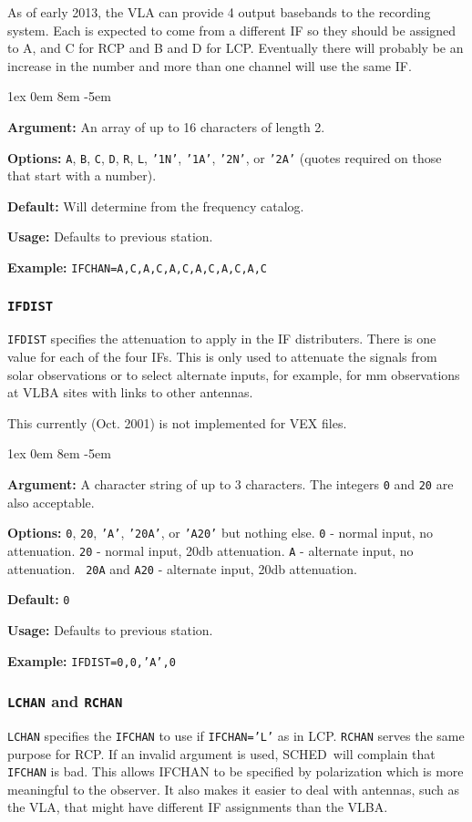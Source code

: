 \documentclass{report}
\newcommand{\schedb}{{\sc SCHED~}}
\newcommand{\rcwbox}[5]{
  \begin{list}{}{\parsep 1ex  \itemsep 0em
                 \leftmargin 8em  \itemindent -5em }
    \item {\bf Argument:} #1
    \item {\bf Options:}  #2
    \item {\bf Default:}  #3
    \item {\bf Usage:}    #4
    \item {\bf Example:}  #5
  \end{list}
}
\begin{document}
As of early 2013, the VLA can provide 4 output basebands to the recording
system.  Each is expected to come from a different IF so they should
be assigned to A, and C for RCP and B and D for LCP.  Eventually there
will probably be an increase in the number and more than one channel
will use the same IF.

\rcwbox
{An array of up to 16 characters of length 2.}
{{\tt A}, {\tt B}, {\tt C}, {\tt D}, {\tt R}, {\tt L},
{\tt '1N'}, {\tt '1A'}, {\tt '2N'}, or {\tt '2A'} (quotes required
on those that start with a number).}
{Will determine from the frequency catalog.}
{Defaults to previous station.}
{{\tt IFCHAN=A,C,A,C,A,C,A,C,A,C,A,C}}


\subsubsection{\label{SP:IFDIST}{\tt IFDIST}}

{\tt IFDIST} specifies the attenuation to apply in the IF distributers.
There is one value for each of the four IFs. This is only used to
attenuate the signals from solar observations or to select alternate
inputs, for example, for mm observations at VLBA sites with links to
other antennas.

This currently (Oct. 2001) is not implemented for VEX files.

\rcwbox
{A character string of up to 3 characters. The integers {\tt 0} and
{\tt 20} are also acceptable.}
{{\tt 0}, {\tt 20}, {\tt 'A'}, {\tt '20A'}, or {\tt 'A20'} but nothing
else. {\tt 0} - normal input, no attenuation. {\tt 20} - normal input,
20db attenuation. {\tt A} - alternate input, no attenuation. {\tt
20A} and {\tt A20} - alternate input, 20db attenuation.}
{{\tt 0}}
{Defaults to previous station.}
{{\tt IFDIST=0,0,'A',0}}


\subsubsection{\label{SP:LCHAN}{\tt LCHAN} and {\tt RCHAN}}

{\tt LCHAN} specifies the {\tt IFCHAN} to use if {\tt IFCHAN='L'} as
in LCP.  {\tt RCHAN} serves the same purpose for RCP.  If an invalid
argument is used, \schedb will complain that {\tt IFCHAN} is bad.
This allows IFCHAN to be specified by polarization which is more
meaningful to the observer.  It also makes it easier to deal with
antennas, such as the VLA, that might have different IF assignments
than the VLBA.
\end{document}
